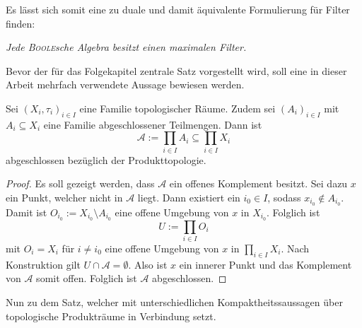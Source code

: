 Es lässt sich somit eine zu \PIT duale und damit äquivalente Formulierung für Filter finden:
  \begin{addmargin}[2em]{2em}%
    \textit{Jede \textsc{Boole}sche Algebra besitzt einen maximalen Filter.}
  \end{addmargin}


Bevor der für das Folgekapitel zentrale Satz vorgestellt wird, soll eine in dieser Arbeit mehrfach verwendete Aussage bewiesen werden.

\begin{prop}
  \label{prop:cartesianclosed}
  Sei $(X_i,\tau_i)_{i \in I}$ eine Familie topologischer Räume. 
  Zudem sei $(A_i)_{i \in I}$ mit  $A_i \subseteq X_i$ eine Familie abgeschlossener Teilmengen.
  Dann ist 
  \begin{displaymath}
    \mathcal{A} := \prod_{i \in I} A_i \subseteq \prod_{i \in I} X_i
  \end{displaymath}
  abgeschlossen bezüglich der Produkttopologie.
\end{prop}

\begin{proof}
  Es soll gezeigt werden, dass $\mathcal{A}$ ein offenes Komplement besitzt.
  Sei dazu $x$ ein Punkt, welcher nicht in $\mathcal{A}$ liegt.
  Dann existiert ein $i_0 \in I$, sodass $x_{i_0} \not\in A_{i_0}$.
  Damit ist $O_{i_0} := X_{i_0} \setminus A_{i_0}$ eine offene Umgebung von $x$ in $X_{i_0}$.
  Folglich ist
  \begin{displaymath}
    U:= \prod_{i \in I} O_i
  \end{displaymath}
  mit $O_i = X_i$ für $i \not= i_0$ eine offene Umgebung von $x$ in $\prod_{i \in I} X_i$.
  Nach Konstruktion gilt $U \cap \mathcal{A} = \emptyset$.
  Also ist $x$ ein innerer Punkt und das Komplement von $\mathcal{A}$ somit offen.
  Folglich ist $\mathcal{A}$ abgeschlossen.
\end{proof}

Nun zu dem Satz, welcher \PIT mit unterschiedlichen Kompaktheitssaussagen über topologische Produkträume in Verbindung setzt.

